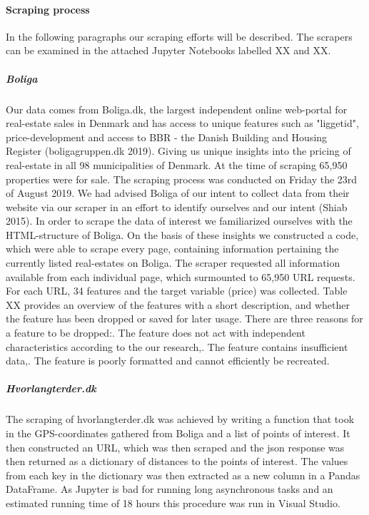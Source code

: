 \documentclass[10pt,a4paper]{report}
\begin{document}
\paragraph{Scraping process\newline}
In the following paragraphs our scraping efforts will be described. The scrapers can be examined in the attached Jupyter Notebooks labelled XX and XX.

\subparagraph{Boliga\newline}
Our data comes from Boliga.dk, the largest independent online web-portal for real-estate sales in Denmark and has access to unique features such as "liggetid", price-development and access to BBR - the Danish Building and Housing Register (boligagruppen.dk 2019). Giving us unique insights into the pricing of real-estate in all 98 municipalities of Denmark. At the time of scraping 65,950 properties were for sale.\newline
The scraping process was conducted on Friday the 23rd of August 2019. We had advised Boliga of our intent to collect data from their website via our scraper in an effort to identify ourselves and our intent (Shiab 2015). In order to scrape the data of interest we familiarized ourselves with the HTML-structure of Boliga. On the basis of these insights we constructed a code, which were able to scrape every page, containing information pertaining the currently listed real-estates on Boliga. The scraper requested all information available from each individual page, which surmounted to 65,950 URL requests. \newline
For each URL, 34 features and the target variable (price) was collected. Table XX provides an overview of the features with a short description, and whether the feature has been dropped or saved for later usage. There are three reasons for a feature to be dropped:. The feature does not act with independent characteristics according to the our research,. The feature contains insufficient data,. The feature is poorly formatted and cannot efficiently be recreated.
\subparagraph{Hvorlangterder.dk\newline}
The scraping of hvorlangterder.dk was achieved by writing a function that took in the GPS-coordinates gathered from Boliga and a list of points of interest. It then constructed an URL, which was then scraped and the json response was then returned as a dictionary of distances to the points of interest. The values from each key in the dictionary was then extracted as a new column in a Pandas DataFrame.\newline
As Jupyter is bad for running long asynchronous tasks and an estimated running time of 18 hours this procedure was run in Visual Studio.
\end{document}
